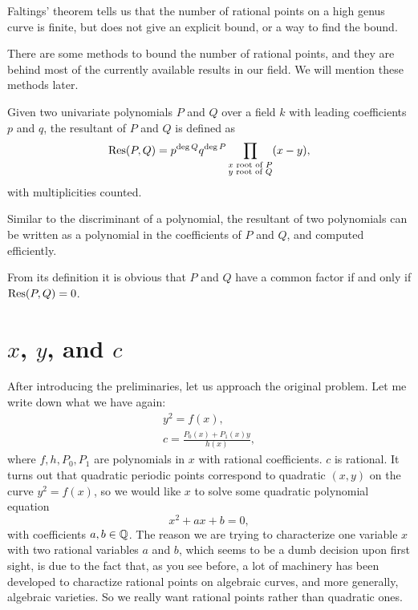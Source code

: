 \begin{remark}
  Faltings' theorem tells us that the number of rational points on a
  high genus curve is finite, but does not give an explicit bound, or
  a way to find the bound.

  There are some methods to bound the number of rational points, and
  they are behind most of the currently available results in our
  field. We will mention these methods later.
\end{remark}

\begin{definition}
  Given two univariate polynomials $P$ and $Q$ over a field $k$ with
  leading coefficients $p$ and $q$, the resultant of $P$ and $Q$ is
  defined as
  \[
  \mathrm{Res}(P, Q) = p^{\deg Q} q^{\deg P}
  \prod_{\substack{\text{$x$ root of $P$}\\
                   \text{$y$ root of $Q$}}} (x - y),
  \]
  with multiplicities counted.
\end{definition}

\begin{remark}
  Similar to the discriminant of a polynomial, the resultant of two
  polynomials can be written as a polynomial in the coefficients of
  $P$ and $Q$, and computed efficiently.

  From its definition it is obvious that $P$ and $Q$ have a common
  factor if and only if $\mathrm{Res}(P, Q) = 0$.
\end{remark}

\section{$x$, $y$, and $c$}

After introducing the preliminaries, let us approach the original
problem. Let me write down what we have again:
\[
\begin{gathered}
  y^2 = f(x),\\
  c = \frac{P_0(x) + P_1(x) y}{h(x)},
\end{gathered}
\]
where $f, h, P_0, P_1$ are polynomials in $x$ with rational
coefficients. $c$ is rational. It turns out that quadratic periodic
points correspond to quadratic $(x, y)$ on the curve $y^2 = f(x)$, so
we would like $x$ to solve some quadratic polynomial equation
\[
x^2 + ax + b = 0,
\]
with coefficients $a, b \in \mathbb{Q}$. The reason we are trying to
characterize one variable $x$ with two rational variables $a$ and $b$,
which seems to be a dumb decision upon first sight, is due to the fact
that, as you see before, a lot of machinery has been developed to
charactize rational points on algebraic curves, and more generally,
algebraic varieties. So we really want rational points rather than
quadratic ones.

